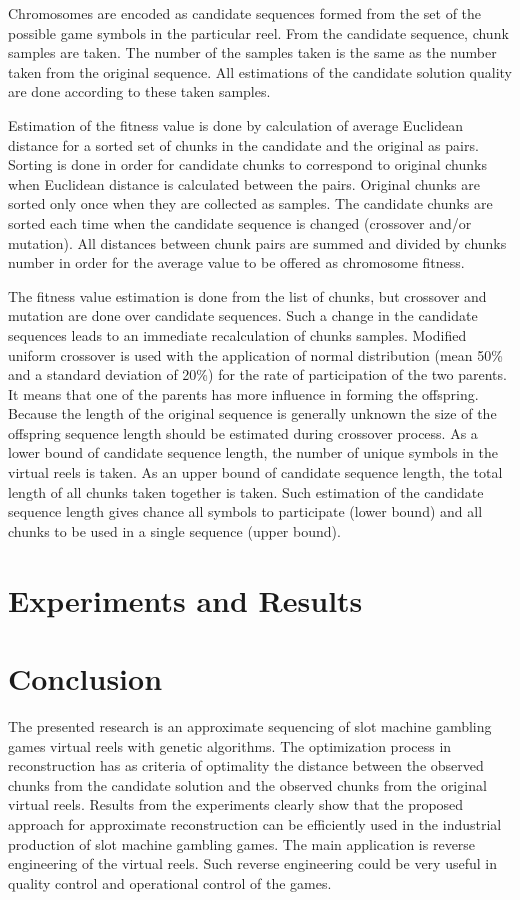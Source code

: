 \documentclass[11pt]{article}
\begin{document}
Chromosomes are encoded as candidate sequences formed from the set of the possible game symbols in the particular reel. From the candidate sequence, chunk samples are taken. The number of the samples taken is the same as the number taken from the original sequence. All estimations of the candidate solution quality are done according to these taken samples. 

Estimation of the fitness value is done by calculation of average Euclidean distance for a sorted set of chunks in the candidate and the original as pairs. Sorting is done in order for candidate chunks to correspond to original chunks when Euclidean distance is calculated between the pairs. Original chunks are sorted only once when they are collected as samples. The candidate chunks are sorted each time when the candidate sequence is changed (crossover and/or mutation). All distances between chunk pairs are summed and divided by chunks number in order for the average value to be offered as chromosome fitness. 

The fitness value estimation is done from the list of chunks, but crossover and mutation are done over candidate sequences. Such a change in the candidate sequences leads to an immediate recalculation of chunks samples. Modified uniform crossover is used with the application of normal distribution (mean 50\% and a standard deviation of 20\%) for the rate of participation of the two parents. It means that one of the parents has more influence in forming the offspring. Because the length of the original sequence is generally unknown the size of the offspring sequence length should be estimated during crossover process. As a lower bound of candidate sequence length, the number of unique symbols in the virtual reels is taken. As an upper bound of candidate sequence length, the total length of all chunks taken together is taken. Such estimation of the candidate sequence length gives chance all symbols to participate (lower bound) and all chunks to be used in a single sequence (upper bound). 

\section{Experiments and Results}

\section{Conclusion}

The presented research is an approximate sequencing of slot machine gambling games virtual reels with genetic algorithms. The optimization process in reconstruction has as criteria of optimality the distance between the observed chunks from the candidate solution and the observed chunks from the original virtual reels. Results from the experiments clearly show that the proposed approach for approximate reconstruction can be efficiently used in the industrial production of slot machine gambling games. The main application is reverse engineering of the virtual reels. Such reverse engineering could be very useful in quality control and operational control of the games. 
\end{document}
